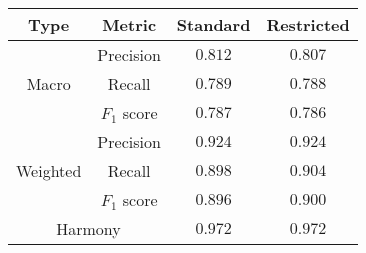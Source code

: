 \begin{tabular}{cccc}
    \textbf{Type}             & \textbf{Metric} & \textbf{Standard} & \textbf{Restricted} \\\hline
    \multirow{3}{*}{Macro}    & Precision       & $\mathbf{0.812}$  & $0.807$             \\
    & Recall          & $\mathbf{0.789}$  & $0.788$             \\
    & $F_1$ score     & $\mathbf{0.787}$  & $0.786$             \\\hline
    \multirow{3}{*}{Weighted} & Precision       & $\mathbf{0.924}$  & $\mathbf{0.924}$    \\
    & Recall          & $0.898$           & $\mathbf{0.904}$    \\
    & $F_1$ score     & $0.896$           & $\mathbf{0.900}$    \\\hline
    \multicolumn{2}{c}{Harmony} & $\mathbf{0.972}$ & $\mathbf{0.972}$ \\
\end{tabular}
